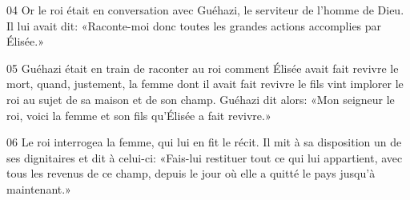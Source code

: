 
04 Or le roi était en conversation avec Guéhazi, le serviteur de l’homme de Dieu. Il lui avait dit: «Raconte-moi donc toutes les grandes actions accomplies par Élisée.»

05 Guéhazi était en train de raconter au roi comment Élisée avait fait revivre le mort, quand, justement, la femme dont il avait fait revivre le fils vint implorer le roi au sujet de sa maison et de son champ. Guéhazi dit alors: «Mon seigneur le roi, voici la femme et son fils qu’Élisée a fait revivre.»

06 Le roi interrogea la femme, qui lui en fit le récit. Il mit à sa disposition un de ses dignitaires et dit à celui-ci: «Fais-lui restituer tout ce qui lui appartient, avec tous les revenus de ce champ, depuis le jour où elle a quitté le pays jusqu’à maintenant.»
